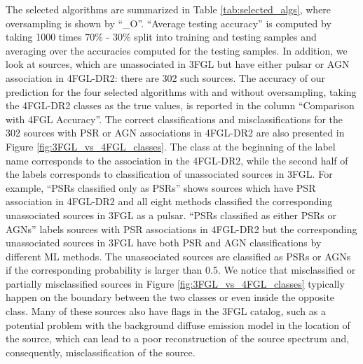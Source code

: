 The selected algorithms are summarized in Table \ref{tab:selected_algs}, where oversampling is shown by ``\_O''.
``Average testing accuracy'' is computed by taking 1000 times 70\% - 30\% split into training and testing samples and averaging over the 
accuracies computed for the testing samples.
In addition, we look at sources, which are unassociated in 3FGL but have either pulsar or AGN association in 4FGL-DR2: there are 302 such sources.
The accuracy of our prediction for the four selected algorithms with and without oversampling, taking the 4FGL-DR2 classes as the true values, is reported in the column ``Comparison with 4FGL Accuracy''.
The correct classifications and misclassifications for the 302 sources with PSR or AGN associations in 4FGL-DR2 are also presented in Figure \ref{fig:3FGL_vs_4FGL_classes}.
The class at the beginning of the label name corresponds to the association in the 4FGL-DR2, while the second half of the labels corresponds to classification of unassociated sources in 3FGL. For example, ``PSRs classified only as PSRs'' shows sources which have PSR association in 4FGL-DR2 and all eight methods classified the corresponding unassociated sources in 3FGL as a pulsar. ``PSRs classified as either PSRs or AGNs'' labels sources with PSR associations in 4FGL-DR2 but the corresponding unassociated sources in 3FGL have both PSR and AGN classifications by different ML methods.
The unassociated sources are classified as PSRs or AGNs if the corresponding probability is larger than 0.5.
We notice that misclassified or partially misclassified sources in Figure \ref{fig:3FGL_vs_4FGL_classes} typically happen on the boundary between the two classes or even inside the opposite class.
Many of these sources also have flags in the 3FGL catalog, such as a potential problem with the background diffuse emission model in the location of the source, which can lead to a poor reconstruction of the source spectrum and, consequently, misclassification of the source.


